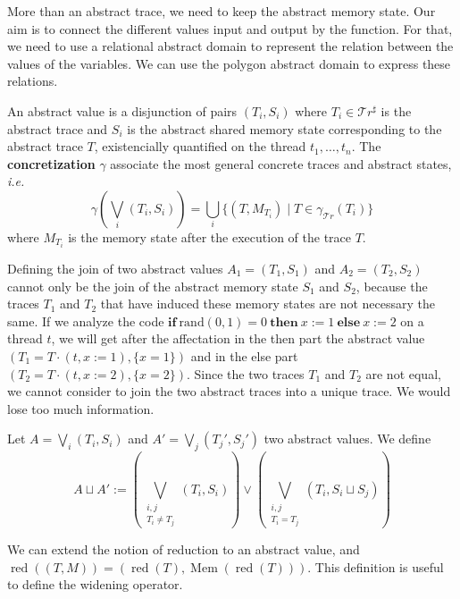 \documentclass[runningheads]{llncs}
\newcommand{\ifinst}{\mathbf{if}}
\newcommand{\theninst}{\mathbf{then}}
\newcommand{\elseinst}{\mathbf{else}}
\newcommand{\Traces}{\mathcal T\!r}
\newcommand{\aTraces}{\mathcal T\!r^\sharp}
\DeclareMathOperator{\red}{red}
\DeclareMathOperator{\Mem}{Mem}
\begin{document}
More than an abstract trace, we need to keep the abstract memory state. Our aim is to connect the different values input and output by the function. For that, we need to use a relational abstract domain to represent the relation between the values of the variables. We can use the polygon abstract domain \cite{DBLP:journals/lisp/Mine06} to express these relations. 



\begin{definition}
	An abstract value is a disjunction of pairs $(T_i, S_i)$ where $T_i \in \aTraces$ is the abstract trace and $S_i$ is the abstract shared memory state corresponding to the abstract trace $T$, existencially quantified on the thread $t_1, \dots, t_n$. The \textbf{concretization} $\gamma$ associate the most general concrete traces and abstract states, \emph{i.e.}
	\[\gamma\left(\bigvee_i (T_i, S_i)\right) = \bigcup_i \{ (T, M_{T_i}) \mid T\in\gamma_{\Traces}(T_i) \}\]
	where $M_{T_i}$ is the memory state after the execution of the trace $T$. 
\end{definition}





Defining the join of two abstract values $A_1 = (T_1, S_1)$ and $A_2 = (T_2, S_2)$ cannot only be the join of the abstract memory state $S_1$ and $S_2$, because the traces $T_1$ and $T_2$ that have induced these memory states are not necessary the same. If we analyze the code $\ifinst\ \mathrm{rand}(0,1) = 0\ \theninst \ x := 1 \ \elseinst \ x :=2$ on a thread $t$, we will get after the affectation in the then part the abstract value $(T_1 = T \cdot (t, x:=1), \{x = 1\})$ and in the else part $(T_2 = T \cdot (t, x:= 2), \{x = 2\})$. Since the two traces $T_1$ and $T_2$ are not equal, we cannot consider to join the two abstract traces into a unique trace. We would lose too much information. 


\begin{definition}[Join]
	Let $A = \bigvee_i (T_i, S_i)$ and $A' = \bigvee_j (T_j', S_j')$ two abstract values. We define
	\[A \sqcup A' := \left(\bigvee_{\substack{i,j\\T_i \neq T_j}} (T_i, S_i) \right) \vee \left(\bigvee_{\substack{i,j \\ T_i = T_j}} (T_i, S_i \sqcup S_j) \right)\]
\end{definition}



We can extend the notion of reduction to an abstract value, and $\red((T, M)) = (\red(T), \Mem(\red(T)))$. 
This definition is useful to define the widening operator. 
\end{document}
